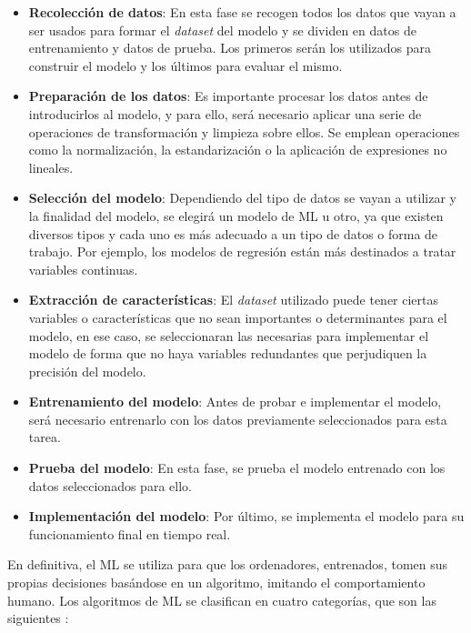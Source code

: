 \begin{itemize}
    \item \textbf{Recolección de datos}: En esta fase se recogen todos los datos que vayan a ser usados para formar el \textit{dataset} del modelo y se dividen en datos de entrenamiento y datos de prueba. Los primeros serán los utilizados para construir el modelo y los últimos para evaluar el mismo.
    \item \textbf{Preparación de los datos}: Es importante procesar los datos antes de introducirlos al modelo, y para ello, será necesario aplicar una serie de operaciones de transformación y limpieza sobre ellos. Se emplean operaciones como la normalización, la estandarización o la aplicación de expresiones no lineales.
    \item \textbf{Selección del modelo}: Dependiendo del tipo de datos se vayan a utilizar y la finalidad del modelo, se elegirá un modelo de \gls{ML} u otro, ya que existen diversos tipos y cada uno es más adecuado a un tipo de datos o forma de trabajo. Por ejemplo, los modelos de regresión están más destinados a tratar variables continuas.
    \item \textbf{Extracción de características}: El \textit{dataset} utilizado puede tener ciertas variables o características que no sean importantes o determinantes para el modelo, en ese caso, se seleccionaran las necesarias para implementar el modelo de forma que no haya variables redundantes que perjudiquen la precisión del modelo.
    \item \textbf{Entrenamiento del modelo}: Antes de probar e implementar el modelo, será necesario entrenarlo con los datos previamente seleccionados para esta tarea.
    \item \textbf{Prueba del modelo}: En esta fase, se prueba el modelo entrenado con los datos seleccionados para ello.
    \item \textbf{Implementación del modelo}: Por último, se implementa el modelo para su funcionamiento final en tiempo real.
\end{itemize}

En definitiva, el \gls{ML} se utiliza para que los ordenadores, entrenados, tomen sus propias decisiones basándose en un algoritmo, imitando el comportamiento humano. Los algoritmos de \gls{ML} se clasifican en cuatro categorías, que son las siguientes \cite{Thomas_2020}:


